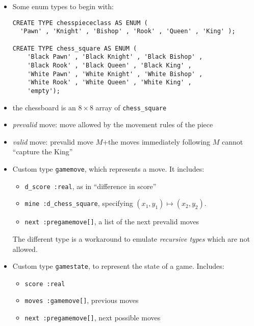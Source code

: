 \begin{itemize}

\item Some enum types to begin with:
\begin{verbatim}
CREATE TYPE chesspiececlass AS ENUM (
  'Pawn' , 'Knight' , 'Bishop' , 'Rook' , 'Queen' , 'King' );

CREATE TYPE chess_square AS ENUM (
	'Black Pawn' , 'Black Knight' , 'Black Bishop' ,
	'Black Rook' , 'Black Queen' , 'Black King' ,
	'White Pawn' , 'White Knight' , 'White Bishop' , 
	'White Rook' , 'White Queen' , 'White King' ,
	'empty');
\end{verbatim}

\item the chessboard is an $8\times 8$ array of \verb+chess_square+

\item \emph{prevalid} move: move allowed by the movement rules of the
  piece

\item \emph{valid} move: prevalid move $M$\quad +\quad the moves
  immediately following $M$ cannot ``capture the King''

\item Custom type \verb+gamemove+, which represents a move. It
  includes:
  \begin{itemize}
  \item \verb+d_score :real+, as in ``difference in score''
  \item \verb+mine :d_chess_square+, specifying $(x_1,y_1)\mapsto(x_2,y_2)$.
  \item \verb+next :pregamemove[]+, a list of the next prevalid moves
  \end{itemize}
  \begin{rem}
    The different type is a workaround to emulate \emph{recursive
      types} which are not allowed.
  \end{rem}

\item Custom type \verb+gamestate+, to represent the state of a
  game. Includes:
  \begin{itemize}
  \item \verb+score :real+
  \item \verb+moves :gamemove[]+, previous moves
  \item \verb+next :pregamemove[]+, next possible moves
  \end{itemize}


\end{itemize}
